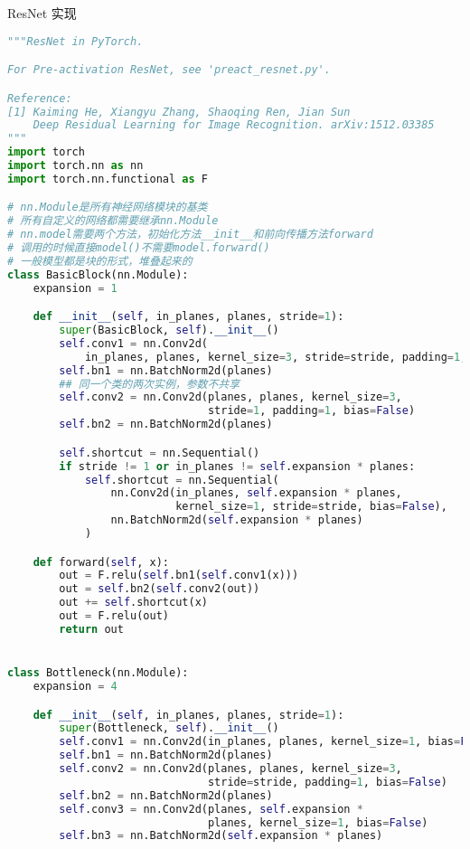 \documentclass{article}
\begin{document}
ResNet 实现
\begin{lstlisting}[language=Python]
"""ResNet in PyTorch.

For Pre-activation ResNet, see 'preact_resnet.py'.

Reference:
[1] Kaiming He, Xiangyu Zhang, Shaoqing Ren, Jian Sun
    Deep Residual Learning for Image Recognition. arXiv:1512.03385
"""
import torch
import torch.nn as nn
import torch.nn.functional as F

# nn.Module是所有神经网络模块的基类
# 所有自定义的网络都需要继承nn.Module
# nn.model需要两个方法，初始化方法__init__和前向传播方法forward
# 调用的时候直接model()不需要model.forward()
# 一般模型都是块的形式，堆叠起来的
class BasicBlock(nn.Module):
    expansion = 1

    def __init__(self, in_planes, planes, stride=1):
        super(BasicBlock, self).__init__()
        self.conv1 = nn.Conv2d(
            in_planes, planes, kernel_size=3, stride=stride, padding=1, bias=False)
        self.bn1 = nn.BatchNorm2d(planes)
        ## 同一个类的两次实例，参数不共享
        self.conv2 = nn.Conv2d(planes, planes, kernel_size=3,
                               stride=1, padding=1, bias=False)
        self.bn2 = nn.BatchNorm2d(planes)

        self.shortcut = nn.Sequential()
        if stride != 1 or in_planes != self.expansion * planes:
            self.shortcut = nn.Sequential(
                nn.Conv2d(in_planes, self.expansion * planes,
                          kernel_size=1, stride=stride, bias=False),
                nn.BatchNorm2d(self.expansion * planes)
            )

    def forward(self, x):
        out = F.relu(self.bn1(self.conv1(x)))
        out = self.bn2(self.conv2(out))
        out += self.shortcut(x)
        out = F.relu(out)
        return out


class Bottleneck(nn.Module):
    expansion = 4

    def __init__(self, in_planes, planes, stride=1):
        super(Bottleneck, self).__init__()
        self.conv1 = nn.Conv2d(in_planes, planes, kernel_size=1, bias=False)
        self.bn1 = nn.BatchNorm2d(planes)
        self.conv2 = nn.Conv2d(planes, planes, kernel_size=3,
                               stride=stride, padding=1, bias=False)
        self.bn2 = nn.BatchNorm2d(planes)
        self.conv3 = nn.Conv2d(planes, self.expansion *
                               planes, kernel_size=1, bias=False)
        self.bn3 = nn.BatchNorm2d(self.expansion * planes)


\end{lstlisting}
\end{document}
